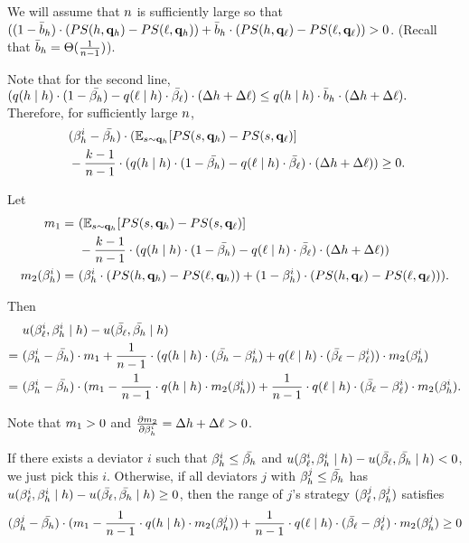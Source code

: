 We will assume that $n$ is sufficiently large so that $((1 - \bar{b}_h) \cdot (PS(h, \mathbf{q}_h) - PS(\ell, \mathbf{q}_h)) + \bar{b}_h \cdot (PS(h, \mathbf{q}_\ell) - PS(\ell, \mathbf{q}_\ell)) > 0$. (Recall that $\bar{b}_h = \Theta(\frac{1}{n - 1})$). 

Note that for the second line, $(q(h \mid h)\cdot ( 1- \bar{\beta_{h}}) - q(\ell \mid h) \cdot \bar{\beta_{\ell}}) \cdot (\Delta h + \Delta \ell)\le  q(h \mid h)\cdot \bar{b}_h \cdot (\Delta h + \Delta \ell).$ Therefore, for sufficiently large $n$, 
\begin{align*}
    &\ (\beta_{h}^i - \bar{\beta_{h}})\cdot (\mathbb{E}_{s\sim \mathbf{q}_{h}}[PS(s, \mathbf{q}_{h}) - PS(s, \mathbf{q}_{\ell})] \\&\ -\frac{k - 1}{n - 1} \cdot (q(h \mid h)\cdot ( 1- \bar{\beta_{h}}) - q(\ell \mid h) \cdot \bar{\beta_{\ell}}) \cdot (\Delta h + \Delta \ell)) \ge 0. 
\end{align*}


Let 
\begin{align*}
    m_1 = &\ (\mathbb{E}_{s\sim \mathbf{q}_{h}}[PS(s, \mathbf{q}_{h}) - PS(s, \mathbf{q}_{\ell})] \\
    &\ -\frac{k - 1}{n - 1} \cdot (q(h \mid h)\cdot ( 1- \bar{\beta_{h}}) - q(\ell \mid h) \cdot \bar{\beta_{\ell}}) \cdot (\Delta h + \Delta \ell))\\
    m_2(\beta_{h}^i) = &\ (\beta_{h}^i \cdot (PS(h, \mathbf{q}_h) - PS(\ell, \mathbf{q}_h)) + ( 1- \beta_{h}^i) \cdot (PS(h, \mathbf{q}_\ell) - PS(\ell, \mathbf{q}_\ell))). 
\end{align*}

Then
\begin{align*}
    &\ u(\beta_{\ell}^i, \beta_{h}^i \mid h) - u(\bar{\beta_{\ell}}, \bar{\beta_{h}} \mid h)\\ =&\ (\beta_{h}^i - \bar{\beta_{h}})\cdot m_1 + \frac{1}{n - 1} \cdot (q(h \mid h) \cdot (\bar{\beta_{h}} - \beta_{h}^i) + q(\ell \mid h) \cdot (\bar{\beta_{\ell}} - \beta_{\ell}^i)) \cdot m_2(\beta_{h}^i)\\
    =&\ (\beta_{h}^i - \bar{\beta_{h}})\cdot(m_1 - \frac{1}{n - 1} \cdot q(h \mid h)\cdot m_2(\beta_{h}^i)) + \frac{1}{n - 1} \cdot q(\ell \mid h) \cdot (\bar{\beta_{\ell}} - \beta_{\ell}^i) \cdot m_2(\beta_{h}^i).
\end{align*}

Note that $m_1 > 0$ and $\frac{\partial m_2}{\partial \beta_{h}^i} = \Delta h + \Delta \ell > 0$. 

If there exists a deviator $i$ such that $\beta_{h}^i \le \bar{\beta_{h}}$ and $u(\beta_{\ell}^i, \beta_{h}^i \mid h) - u(\bar{\beta_{\ell}}, \bar{\beta_{h}} \mid h) < 0$, we just pick this $i$. Otherwise, if all deviators $j$ with $\beta_{h}^j \le \bar{\beta_{h}}$ has $u(\beta_{\ell}^i, \beta_{h}^i \mid h) - u(\bar{\beta_{\ell}}, \bar{\beta_{h}} \mid h) \ge 0$, then the range of $j$'s strategy $(\beta_{\ell}^j, \beta_{h}^j)$ satisfies
\begin{equation*}
    (\beta_{h}^j - \bar{\beta_{h}})\cdot(m_1 - \frac{1}{n - 1} \cdot q(h \mid h)\cdot m_2(\beta_{h}^j)) + \frac{1}{n - 1} \cdot q(\ell \mid h) \cdot (\bar{\beta_{\ell}} - \beta_{\ell}^j) \cdot m_2(\beta_{h}^j) \ge 0
\end{equation*}

